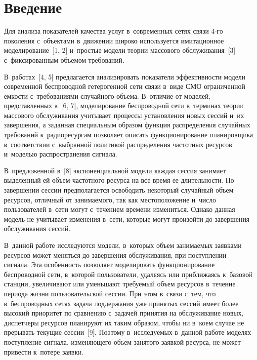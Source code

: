 



\thispagestyle{headings}

\begin{multicols}{2}

\label{st\stat}
  
\section{Введение}

  Для анализа показателей качества услуг в~современных сетях связи 4-го 
поколения с~объектами в~движении широко используется имитационное 
моделирование~[1, 2] и~простые модели теории массового обслуживания~[3] 
с~фиксированным объемом требований. 

В~работах~[4, 5] предлагается 
анализировать показатели эффективности модели современной беспроводной 
гетерогенной сети связи в~виде СМО
ограниченной емкости с~требованиями случайного объема. В~отличие от 
моделей, представленных в~[6, 7], моделирование беспроводной сети 
в~терминах теории массового обслуживания учитывает процессы 
установления новых сессий и~их завершения, а заданная специальным 
образом функция распределения случайных требований к~радиоресурсам 
позволяет описать функционирование планировщика в~соответствии 
с~выбранной политикой распределения частотных ресурсов и~моделью 
распространения сигнала. 

В~предложенной в~[8] экспоненциальной модели 
каждая сессия занимает выделенный ей объем частотного ресурса на все 
время ее длительности. По завершении сессии предполагается освободить 
некоторый случайный объем ресурсов, отличный от занимаемого, так как 
местоположение и~число пользователей в~сети могут с~течением времени 
измениться. Однако данная модель не учитывает изменения в~сети, которые 
могут произойти до завершения обслуживания сессий. 
  
  В~данной работе исследуются модели, в~которых объем занимаемых 
заявками ресурсов может меняться до завершения обслуживания, при 
поступлении сигнала. Эта особенность позволяет моделировать 
функционирование беспроводной сети, в~которой пользователи, удаляясь или 
приближаясь к~базовой станции, увеличивают или уменьшают требуемый 
объем ресурсов в~течение периода жизни пользовательской сессии. 
  При этом в~связи с~тем, что в~беспроводных сетях задача поддержания уже 
принятых сессий имеет более высокий приоритет по сравнению с~задачей 
принятия на обслуживание новых, диспетчеры ресурсов планируют их таким 
образом, чтобы ни в~коем случае не прерывать текущие сессии~[9]. Поэтому 
в~исследуемых в~данной работе моделях поступление сигнала, изменяющего 
объем занятого заявкой ресурса, не может привести к~потере заявки.
  

\end{multicols}
